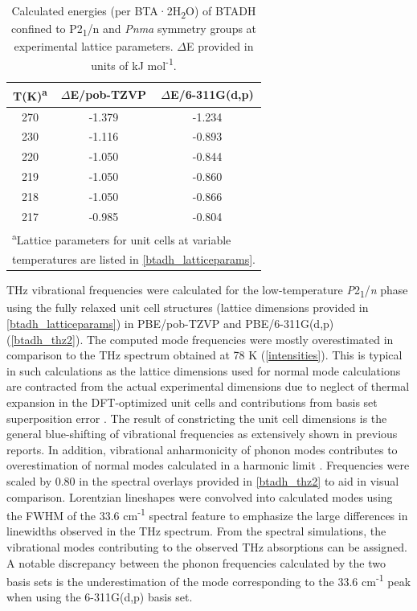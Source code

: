 \begin{table}[ht]
    \centering
    \begin{tabular}{ccc}
        \textbf{T(K)\textsuperscript{a}}    &   \textbf{\(\Delta\)E/pob-TZVP} &   \textbf{\(\Delta\)E/6-311G(d,p)}     \\
        \hline
        270     &   -1.379      &   -1.234          \\
        230     &   -1.116      &   -0.893          \\
        220     &   -1.050      &   -0.844          \\
        219     &   -1.050      &   -0.860          \\
        218     &   -1.050      &   -0.866          \\
        217     &   -0.985      &   -0.804          \\
        \hline
        \multicolumn{3}{l}{\textsuperscript{a}Lattice parameters for unit cells at variable}\\
        \multicolumn{3}{l}{temperatures are listed in \autoref{btadh_latticeparams}.}
    \end{tabular}
    \caption{Calculated energies (per BTA·2H\textsubscript{2}O) of BTADH confined to P2\textsubscript{1}/n and \textit{Pnma} symmetry groups at experimental lattice parameters. \(\Delta\)E provided in units of kJ mol\textsuperscript{-1}.}
    \label{E_pobtzvp}
\end{table}



THz vibrational frequencies were calculated for the low-temperature \textit{P}2\textsubscript{1}/\textit{n} phase using the fully relaxed unit cell structures (lattice dimensions provided in \autoref{btadh_latticeparams}) in PBE/pob-TZVP and PBE/6-311G(d,p) (\autoref{btadh_thz2}). The computed mode frequencies were mostly overestimated in comparison to the THz spectrum obtained at 78 K (\autoref{intensities}). This is typical in such calculations as the lattice dimensions used for normal mode calculations are contracted from the actual experimental dimensions due to neglect of thermal expansion in the DFT-optimized unit cells and contributions from basis set superposition error \citep{king_application_2011,king_modified_2012}. The result of constricting the unit cell dimensions is the general blue-shifting of vibrational frequencies as extensively shown in previous reports. In addition, vibrational anharmonicity of phonon modes contributes to overestimation of normal modes calculated in a harmonic limit \citep{ruggiero_resolving_2016,kleist_terahertz_2019,king_investigating_2010}. Frequencies were scaled by 0.80 in the spectral overlays provided in \autoref{btadh_thz2} to aid in visual comparison. Lorentzian lineshapes were convolved into calculated modes using the FWHM of the 33.6 cm\textsuperscript{-1} spectral feature to emphasize the large differences in linewidths observed in the THz spectrum. From the spectral simulations, the vibrational modes contributing to the observed THz absorptions can be assigned. A notable discrepancy between the phonon frequencies calculated by the two basis sets is the underestimation of the mode corresponding to the 33.6 cm\textsuperscript{-1} peak when using the 6-311G(d,p) basis set.

